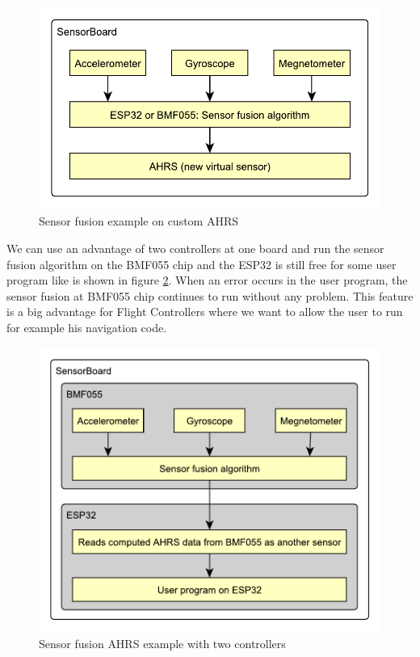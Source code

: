 \begin{figure}
	\centering
	\label{UEAHRS}
	\caption{Sensor fusion example on custom \ac{AHRS}}
	\includegraphics[scale=1]{img/UsageExamplesAHRS.pdf}
\end{figure}

We can use an advantage of two controllers at one board and run the sensor fusion algorithm on the BMF055 chip and the ESP32 is still free for some user program like is shown in figure \ref{UEAHRSBMF}. When an error occurs in the user program, the sensor fusion at BMF055 chip continues to run without any problem. This feature is a big advantage for Flight Controllers where we want to allow the user to run for example his navigation code.

\begin{figure}
	\centering
	\label{UEAHRSBMF}
	\caption{Sensor fusion \ac{AHRS} example with two controllers}
	\includegraphics[scale=1]{img/UsageExamplesAHRSBMF.pdf}
\end{figure}

